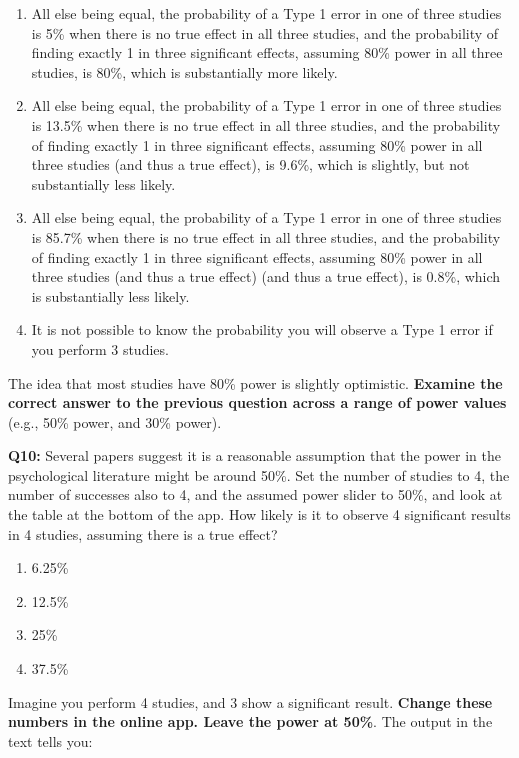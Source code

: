 \documentclass[
  oneside]{book}
\providecommand{\tightlist}{%
  \setlength{\itemsep}{0pt}\setlength{\parskip}{0pt}}
\begin{document}
\begin{enumerate}
\def\labelenumi{\Alph{enumi})}
\tightlist
\item
  All else being equal, the probability of a Type 1 error in one of three studies is 5\% when there is no true effect in all three studies, and the probability of finding exactly 1 in three significant effects, assuming 80\% power in all three studies, is 80\%, which is substantially more likely.
\item
  All else being equal, the probability of a Type 1 error in one of three studies is 13.5\% when there is no true effect in all three studies, and the probability of finding exactly 1 in three significant effects, assuming 80\% power in all three studies (and thus a true effect), is 9.6\%, which is slightly, but not substantially less likely.
\item
  All else being equal, the probability of a Type 1 error in one of three studies is 85.7\% when there is no true effect in all three studies, and the probability of finding exactly 1 in three significant effects, assuming 80\% power in all three studies (and thus a true effect) (and thus a true effect), is 0.8\%, which is substantially less likely.
\item
  It is not possible to know the probability you will observe a Type 1 error if you perform 3 studies.
\end{enumerate}

The idea that most studies have 80\% power is slightly optimistic. \textbf{Examine the correct answer to the previous question across a range of power values} (e.g., 50\% power, and 30\% power).

\textbf{Q10:} Several papers suggest it is a reasonable assumption that the power in the psychological literature might be around 50\%. Set the number of studies to 4, the number of successes also to 4, and the assumed power slider to 50\%, and look at the table at the bottom of the app. How likely is it to observe 4 significant results in 4 studies, assuming there is a true effect?

\begin{enumerate}
\def\labelenumi{\Alph{enumi})}
\tightlist
\item
  6.25\%
\item
  12.5\%
\item
  25\%
\item
  37.5\%
\end{enumerate}

Imagine you perform 4 studies, and 3 show a significant result. \textbf{Change these numbers in the online app. Leave the power at 50\%}. The output in the text tells you:
\end{document}
